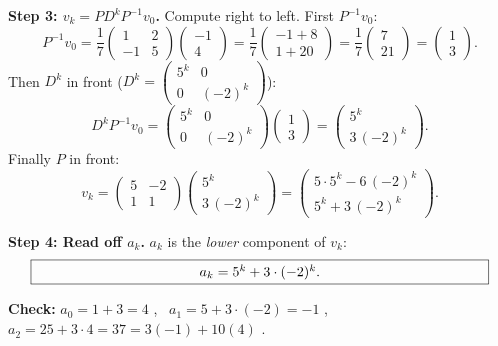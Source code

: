 \documentclass[a4paper,12pt]{article}
\begin{document}
\textbf{Step 3: $v_k = P D^k P^{-1} v_0$.} Compute right to left. First $P^{-1} v_0$:
\[
P^{-1} v_0 = \frac{1}{7}\begin{pmatrix} 1 & 2 \\ -1 & 5 \end{pmatrix}\begin{pmatrix} -1 \\ 4 \end{pmatrix} = \frac{1}{7}\begin{pmatrix} -1 + 8 \\ 1 + 20 \end{pmatrix} = \frac{1}{7}\begin{pmatrix} 7 \\ 21 \end{pmatrix} = \begin{pmatrix} 1 \\ 3 \end{pmatrix}.
\]
Then $D^k$ in front ($D^k = \left(\begin{smallmatrix} 5^k & 0 \\ 0 & (-2)^k \end{smallmatrix}\right)$):
\[
D^k P^{-1} v_0 = \begin{pmatrix} 5^k & 0 \\ 0 & (-2)^k \end{pmatrix}\begin{pmatrix} 1 \\ 3 \end{pmatrix} = \begin{pmatrix} 5^k \\ 3\,(-2)^k \end{pmatrix}.
\]
Finally $P$ in front:
\[
v_k = \begin{pmatrix} 5 & -2 \\ 1 & 1 \end{pmatrix}\begin{pmatrix} 5^k \\ 3\,(-2)^k \end{pmatrix} = \begin{pmatrix} 5\cdot 5^k - 6\,(-2)^k \\ 5^k + 3\,(-2)^k \end{pmatrix}.
\]

\textbf{Step 4: Read off $a_k$.} $a_k$ is the \emph{lower} component of $v_k$:
\[
\fbox{\parbox{0.93\textwidth}{\centering
$a_k = 5^k + 3\cdot(-2)^k.$
}}
\]

\textbf{Check:} $a_0 = 1 + 3 = 4$ \checkmark, \ $a_1 = 5 + 3\cdot(-2) = -1$ \checkmark, \ $a_2 = 25 + 3\cdot 4 = 37 = 3(-1) + 10(4)$ \checkmark.
\end{document}
